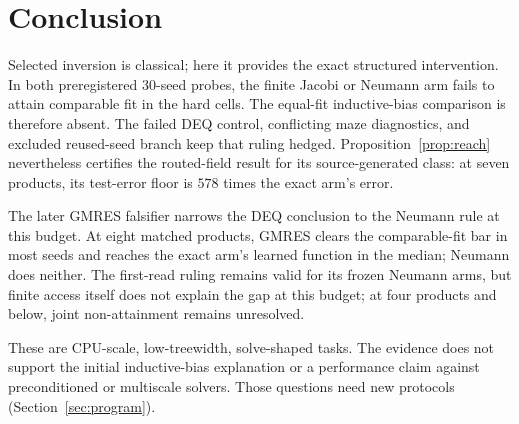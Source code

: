 \section{Conclusion}
\label{sec:conclusion}

Selected inversion is classical; here it provides the exact structured
intervention. In both preregistered 30-seed probes, the finite Jacobi or
Neumann arm fails to attain comparable fit in the hard cells. The equal-fit
inductive-bias comparison is therefore absent. The failed DEQ control,
conflicting maze diagnostics, and excluded reused-seed branch keep that ruling
hedged. Proposition~\ref{prop:reach} nevertheless certifies the routed-field
result for its source-generated class: at seven products, its test-error floor
is $578$ times the exact arm's error.

The later GMRES falsifier narrows the DEQ conclusion to the Neumann rule at
this budget. At eight matched products, GMRES clears the comparable-fit bar in
most seeds and reaches
the exact arm's learned function in the median; Neumann does neither. The first-read ruling remains valid
for its frozen Neumann arms, but finite access itself does not explain the gap
at this budget; at four products and below, joint non-attainment remains
unresolved.

These are CPU-scale, low-treewidth, solve-shaped tasks. The evidence does not
support the initial inductive-bias explanation or a performance claim against
preconditioned or multiscale solvers. Those questions need new protocols
(Section~\ref{sec:program}).
